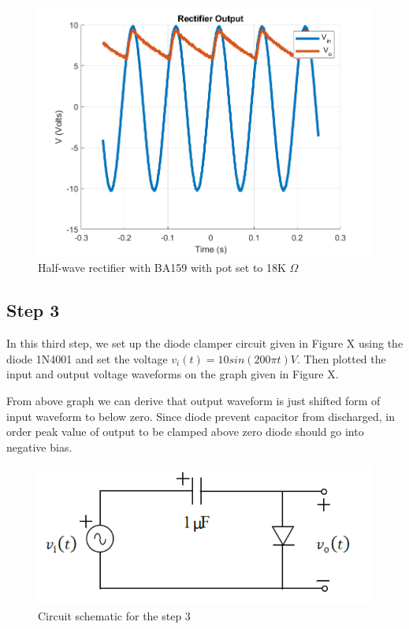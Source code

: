 \documentclass[letterpaper,12pt]{article}
\begin{document}
\begin{figure}[H]
    \centering
    \includegraphics[width=1\textwidth]{2_b_POT_18K.png}
    \caption{Half-wave rectifier with BA159 with pot set to 18K \(\Omega\)}
\end{figure} 


\subsection{Step 3}

In this third step, we set up the diode clamper circuit given in Figure X using the diode 1N4001 and set the voltage \(v_i(t) = 10sin(200\pi t) V\). Then plotted the input and output voltage waveforms on the graph given in Figure X.

From above graph we can derive that output waveform is just shifted form of input waveform to below zero. Since diode prevent capacitor from discharged, in order peak value of output to be clamped above zero diode should go into negative bias.

\begin{figure}[H]
    \centering
    \includegraphics[width=1\textwidth]{3_1.png}
    \caption{Circuit schematic for the step 3}
\end{figure} 
    
\end{document}
